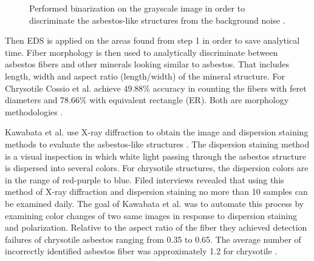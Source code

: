 \begin{figure}[h]
\centering
\caption{Performed binarization on the grayscale image in order to discriminate the asbestos-like structures from the background noise \cite{cossio2018innovative}. }
\label{fig:binarization}
\end{figure}

Then EDS is applied on the areas found from step 1 in order to save analytical time. Fiber morphology is then used to analytically discriminate between asbestos fibers and other minerals looking similar to asbestos. That includes length, width and aspect ratio (length/width) of the mineral structure. For Chrysotile Cossio et al. achieve 49.88\% accuracy in counting the fibers with feret diameters and 78.66\% with equivalent rectangle (ER). Both are morphology methodologies \cite{cossio2018innovative}.

Kawabata et al. use X-ray diffraction to obtain the image and dispersion staining methods to evaluate the asbestos-like structures \cite{kawabata2009asbestos}. The dispersion staining method is a visual inspection in which white light passing through the asbestos structure is dispersed into several colors. For chrysotile structures, the dispersion colors are in the range of red-purple to blue. Filed interviews revealed that using this method of X-ray diffraction and dispersion staining no more than 10 samples can be examined daily. The goal of Kawabata et al. was to automate this process by examining color changes of two same images in response to dispersion staining and polarization. Relative to the aspect ratio of the fiber they achieved detection failures of chrysotile asbestos ranging from 0.35 to 0.65. The average number of incorrectly identified asbestos fiber was approximately 1.2 for chrysotile \cite{kawabata2009asbestos}. 

